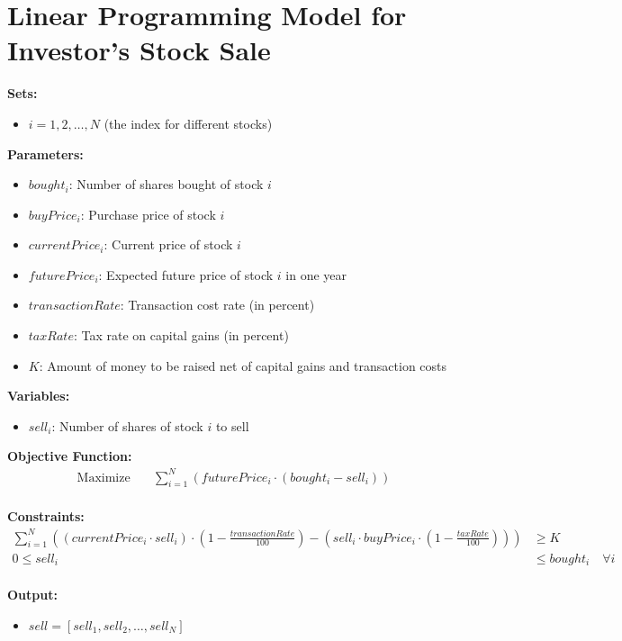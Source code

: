 \documentclass{article}
\begin{document}
\section*{Linear Programming Model for Investor's Stock Sale}

\textbf{Sets:}
\begin{itemize}
    \item $i = 1, 2, \ldots, N$ (the index for different stocks)
\end{itemize}

\textbf{Parameters:}
\begin{itemize}
    \item $bought_i$: Number of shares bought of stock $i$
    \item $buyPrice_i$: Purchase price of stock $i$
    \item $currentPrice_i$: Current price of stock $i$
    \item $futurePrice_i$: Expected future price of stock $i$ in one year
    \item $transactionRate$: Transaction cost rate (in percent)
    \item $taxRate$: Tax rate on capital gains (in percent)
    \item $K$: Amount of money to be raised net of capital gains and transaction costs
\end{itemize}

\textbf{Variables:}
\begin{itemize}
    \item $sell_i$: Number of shares of stock $i$ to sell
\end{itemize}

\textbf{Objective Function:}
\begin{align*}
    \text{Maximize} \quad & \sum_{i=1}^{N} \left( futurePrice_i \cdot (bought_i - sell_i) \right) \\
\end{align*}

\textbf{Constraints:}
\begin{align*}
    \sum_{i=1}^{N} \left( (currentPrice_i \cdot sell_i) \cdot (1 - \frac{transactionRate}{100}) - (sell_i \cdot buyPrice_i \cdot (1 - \frac{taxRate}{100})) \right) & \geq K \\
    0 \leq sell_i & \leq bought_i \quad \forall i \\
\end{align*}

\textbf{Output:}
\begin{itemize}
    \item $sell = [sell_1, sell_2, \ldots, sell_N]$
\end{itemize}
\end{document}
